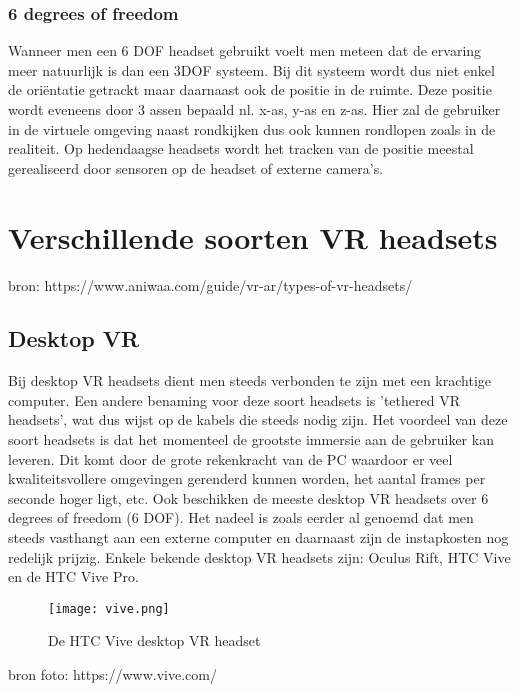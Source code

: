 \subsubsection{6 degrees of freedom}
Wanneer men een 6 DOF headset gebruikt voelt men meteen dat de ervaring meer natuurlijk is dan een 3DOF systeem. Bij dit systeem wordt dus niet enkel de oriëntatie getrackt maar daarnaast ook de positie in de ruimte. Deze positie wordt eveneens door 3 assen bepaald nl. x-as, y-as en z-as. Hier zal de gebruiker in de virtuele omgeving naast rondkijken dus ook kunnen rondlopen zoals in de realiteit. Op hedendaagse headsets wordt het tracken van de positie meestal gerealiseerd door sensoren op de headset of externe camera's.

\section{Verschillende soorten VR headsets}

bron: https://www.aniwaa.com/guide/vr-ar/types-of-vr-headsets/

\subsection{Desktop VR}
Bij desktop VR headsets dient men steeds verbonden te zijn met een krachtige computer. Een andere benaming voor deze soort headsets is 'tethered VR headsets', wat dus wijst op de kabels die steeds nodig zijn. Het voordeel van deze soort headsets is dat het momenteel de grootste immersie aan de gebruiker kan leveren. Dit komt door de grote rekenkracht van de PC waardoor er veel kwaliteitsvollere omgevingen gerenderd kunnen worden, het aantal frames per seconde hoger ligt, etc. Ook beschikken de meeste desktop VR headsets over 6 degrees of freedom (6 DOF). Het nadeel is zoals eerder al genoemd dat men steeds vasthangt aan een externe computer en daarnaast zijn de instapkosten nog redelijk prijzig. Enkele bekende desktop VR headsets zijn: Oculus Rift, HTC Vive en de HTC Vive Pro.

\begin{figure}[h]
    \centering
    \texttt{[image: vive.png]}
    \caption{De HTC Vive desktop VR headset}
\end{figure}
bron foto: https://www.vive.com/

